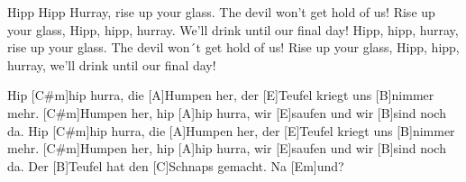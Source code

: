 \begin{guitar}
	Hipp Hipp Hurray, rise up your glass. The devil won't get hold of us!
	Rise up your glass, Hipp, hipp, hurray. We'll drink until our final day!
	Hipp, hipp, hurray, rise up your glass. The devil won´t get hold of us!
	Rise up your glass, Hipp, hipp, hurray, we'll drink until our final day!
	
	Hip [C#m]hip hurra, die [A]Humpen her, der [E]Teufel kriegt uns [B]nimmer mehr.
	[C#m]Humpen her, hip [A]hip hurra, wir [E]saufen und wir [B]sind noch da.
	Hip [C#m]hip hurra, die [A]Humpen her, der [E]Teufel kriegt uns [B]nimmer mehr.
	[C#m]Humpen her, hip [A]hip hurra, wir [E]saufen und wir [B]sind noch da.
	Der [B]Teufel hat den [C]Schnaps gemacht. Na [Em]und?
	
	
\end{guitar}